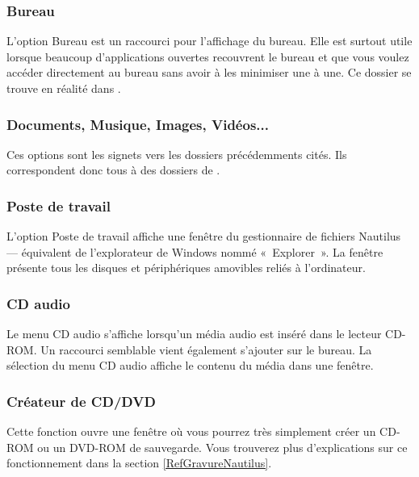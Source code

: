 \subsubsection{Bureau}
L'option Bureau est un raccourci pour l'affichage du bureau. Elle est surtout utile lorsque beaucoup d'applications ouvertes recouvrent le bureau et que vous voulez accéder directement au bureau sans avoir à les minimiser une à une. Ce dossier se trouve en réalité dans .
\subsubsection{Documents, Musique, Images, Vidéos...}
Ces options sont les signets vers les dossiers précédemments cités. Ils correspondent donc tous à des dossiers de .
\subsubsection{Poste de travail}
L'option Poste de travail affiche une fenêtre du gestionnaire de fichiers Nautilus --- équivalent  de l'explorateur de Windows nommé «~Explorer~». La fenêtre présente tous les disques et périphériques amovibles reliés à l'ordinateur. 
\subsubsection{CD audio}
Le menu CD audio s'affiche lorsqu'un média audio est inséré dans le lecteur CD-ROM. Un raccourci semblable vient également s'ajouter sur le bureau. La sélection du menu CD audio affiche le contenu du média dans une fenêtre. 
\subsubsection{Créateur de CD/DVD}
Cette fonction ouvre une fenêtre où vous pourrez très simplement créer un CD-ROM ou un DVD-ROM de sauvegarde. Vous trouverez plus d'explications sur ce fonctionnement dans la section \ref{RefGravureNautilus}.
